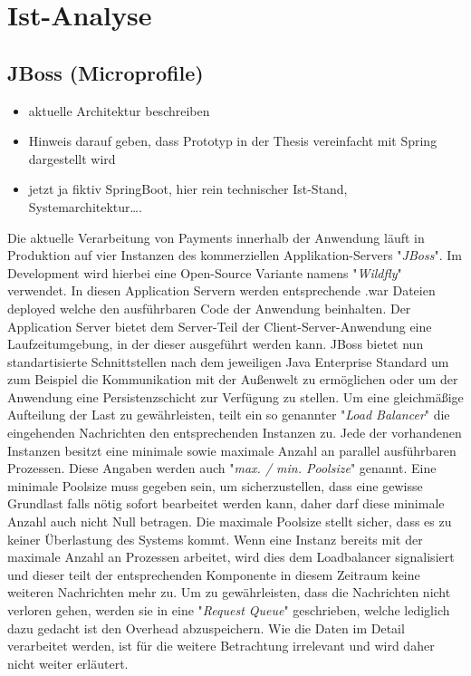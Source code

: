 \chapter{Ist-Analyse}

\section{JBoss (Microprofile)}
\begin{itemize}
  \item aktuelle Architektur beschreiben
  \item Hinweis darauf geben, dass Prototyp in der Thesis vereinfacht mit Spring dargestellt wird
  \item jetzt ja fiktiv SpringBoot, hier rein technischer Ist-Stand, Systemarchitektur….
\end{itemize}

Die aktuelle Verarbeitung von Payments innerhalb der Anwendung läuft in Produktion auf vier Instanzen des kommerziellen Applikation-Servers "\emph{JBoss}". Im Development wird hierbei eine Open-Source Variante namens "\emph{Wildfly}" verwendet. In diesen Application Servern werden entsprechende .war Dateien deployed welche den ausführbaren Code der Anwendung beinhalten. Der Application Server bietet dem Server-Teil der Client-Server-Anwendung eine Laufzeitumgebung, in der dieser ausgeführt werden kann. JBoss bietet nun standartisierte Schnittstellen nach dem jeweiligen Java Enterprise Standard um zum Beispiel die Kommunikation mit der Außenwelt zu ermöglichen oder um der Anwendung eine Persistenzschicht zur Verfügung zu stellen. Um eine gleichmäßige Aufteilung der Last zu gewährleisten, teilt ein so genannter "\emph{Load Balancer}" die eingehenden Nachrichten den entsprechenden Instanzen zu. Jede der vorhandenen Instanzen besitzt eine minimale sowie maximale Anzahl an parallel ausführbaren Prozessen. Diese Angaben werden auch "\emph{max. / min. Poolsize}" genannt. Eine minimale Poolsize muss gegeben sein, um sicherzustellen, dass eine gewisse Grundlast falls nötig sofort bearbeitet werden kann, daher darf diese minimale Anzahl auch nicht Null betragen. Die maximale Poolsize stellt sicher, dass es zu keiner Überlastung des Systems kommt. Wenn eine Instanz bereits mit der maximale Anzahl an Prozessen arbeitet, wird dies dem Loadbalancer signalisiert und dieser teilt der entsprechenden Komponente in diesem Zeitraum keine weiteren Nachrichten mehr zu. Um zu gewährleisten, dass die Nachrichten nicht verloren gehen, werden sie in eine "\emph{Request Queue}" geschrieben, welche lediglich dazu gedacht ist den Overhead abzuspeichern. Wie die Daten im Detail verarbeitet werden, ist für die weitere Betrachtung irrelevant und wird daher nicht weiter erläutert.

